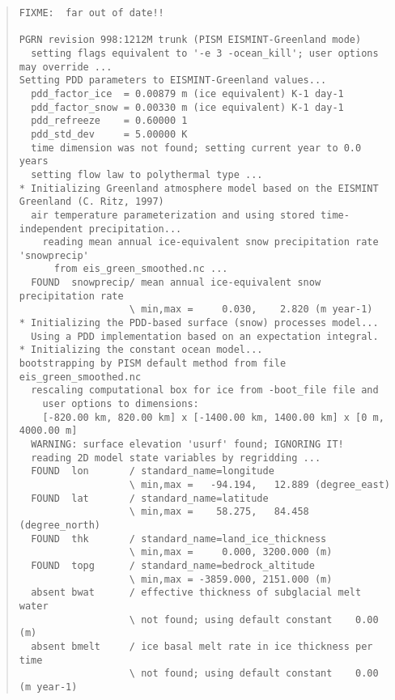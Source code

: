\begin{table}
\centering
\scriptsize
\begin{quote}
\begin{verbatim}
FIXME:  far out of date!!

PGRN revision 998:1212M trunk (PISM EISMINT-Greenland mode)
  setting flags equivalent to '-e 3 -ocean_kill'; user options may override ...
Setting PDD parameters to EISMINT-Greenland values...
  pdd_factor_ice  = 0.00879 m (ice equivalent) K-1 day-1
  pdd_factor_snow = 0.00330 m (ice equivalent) K-1 day-1
  pdd_refreeze    = 0.60000 1
  pdd_std_dev     = 5.00000 K
  time dimension was not found; setting current year to 0.0 years
  setting flow law to polythermal type ...
* Initializing Greenland atmosphere model based on the EISMINT Greenland (C. Ritz, 1997)
  air temperature parameterization and using stored time-independent precipitation...
    reading mean annual ice-equivalent snow precipitation rate 'snowprecip'
      from eis_green_smoothed.nc ... 
  FOUND  snowprecip/ mean annual ice-equivalent snow precipitation rate          
                   \ min,max =     0.030,    2.820 (m year-1)
* Initializing the PDD-based surface (snow) processes model...
  Using a PDD implementation based on an expectation integral.
* Initializing the constant ocean model...
bootstrapping by PISM default method from file eis_green_smoothed.nc
  rescaling computational box for ice from -boot_file file and
    user options to dimensions:
    [-820.00 km, 820.00 km] x [-1400.00 km, 1400.00 km] x [0 m, 4000.00 m]
  WARNING: surface elevation 'usurf' found; IGNORING IT!
  reading 2D model state variables by regridding ...
  FOUND  lon       / standard_name=longitude                                                   
                   \ min,max =   -94.194,   12.889 (degree_east)
  FOUND  lat       / standard_name=latitude                                                    
                   \ min,max =    58.275,   84.458 (degree_north)
  FOUND  thk       / standard_name=land_ice_thickness                                          
                   \ min,max =     0.000, 3200.000 (m)
  FOUND  topg      / standard_name=bedrock_altitude                                            
                   \ min,max = -3859.000, 2151.000 (m)
  absent bwat      / effective thickness of subglacial melt water                
                   \ not found; using default constant    0.00 (m)
  absent bmelt     / ice basal melt rate in ice thickness per time               
                   \ not found; using default constant    0.00 (m year-1)

\end{verbatim}
\end{quote}
\end{table}
